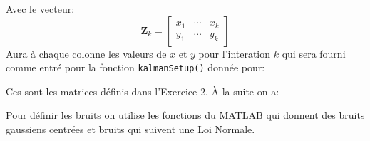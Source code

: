 \documentclass{article}
\begin{document}
\noindent Avec le vecteur:$$\mathbf{Z}_{k} = \begin{bmatrix} x_{1} & \cdots & x_{k}\\ y_{1} & \cdots & y_{k} \end{bmatrix}$$Aura à chaque colonne les valeurs de $x$ et $y$ pour l'interation $k$ qui sera fourni comme entré pour la fonction \texttt{kalmanSetup()} donnée pour:
\begin{scriptsize}\mycode
    
    
    
    
    
    
    
\end{scriptsize}
Ces sont les matrices définis dans l'Exercice 2. \cite{cellMATLAB} À la suite on a:
\begin{scriptsize}\mycode
    
\end{scriptsize}
Pour définir les bruits on utilise les fonctions du MATLAB \cite{awgnMATLAB} \cite{wgnMATLAB} \cite{randnMATLAB} qui donnent des bruits gaussiens centrées et bruits qui suivent une Loi Normale. \cite{bruitBlancMATLAB} \cite{bruitBlancMATLABrand} \cite{bruitBlancMATLABwgn}\\
\end{document}

